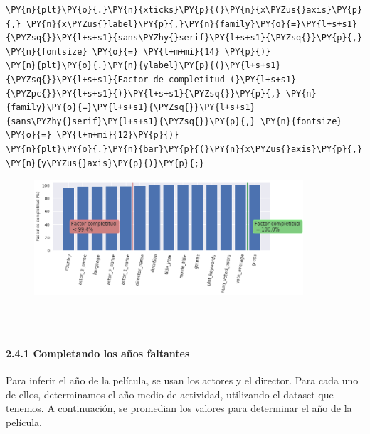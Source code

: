 \begin{tcolorbox}[breakable, size=fbox, boxrule=1pt, pad at break*=1mm,colback=cellbackground, colframe=cellborder]
\begin{Verbatim}[commandchars=\\\{\}]
\PY{n}{plt}\PY{o}{.}\PY{n}{xticks}\PY{p}{(}\PY{n}{x\PYZus{}axis}\PY{p}{,} \PY{n}{x\PYZus{}label}\PY{p}{,}\PY{n}{family}\PY{o}{=}\PY{l+s+s1}{\PYZsq{}}\PY{l+s+s1}{sans\PYZhy{}serif}\PY{l+s+s1}{\PYZsq{}}\PY{p}{,} \PY{n}{fontsize} \PY{o}{=} \PY{l+m+mi}{14} \PY{p}{)}
\PY{n}{plt}\PY{o}{.}\PY{n}{ylabel}\PY{p}{(}\PY{l+s+s1}{\PYZsq{}}\PY{l+s+s1}{Factor de completitud (}\PY{l+s+s1}{\PYZpc{}}\PY{l+s+s1}{)}\PY{l+s+s1}{\PYZsq{}}\PY{p}{,} \PY{n}{family}\PY{o}{=}\PY{l+s+s1}{\PYZsq{}}\PY{l+s+s1}{sans\PYZhy{}serif}\PY{l+s+s1}{\PYZsq{}}\PY{p}{,} \PY{n}{fontsize} \PY{o}{=} \PY{l+m+mi}{12}\PY{p}{)}
\PY{n}{plt}\PY{o}{.}\PY{n}{bar}\PY{p}{(}\PY{n}{x\PYZus{}axis}\PY{p}{,} \PY{n}{y\PYZus{}axis}\PY{p}{)}\PY{p}{;}
\end{Verbatim}
\end{tcolorbox}

\begin{figure}[h]
    \centering
    \captionsetup{width=10cm}
    \includegraphics[width=10cm]{./contenido/imagenes/output_72_0.png}

\end{figure}
    { \hspace*{\fill} \\}
    
    \begin{center}\rule{0.5\linewidth}{\linethickness}\end{center}

\paragraph{2.4.1 Completando los años
faltantes}\label{completando-los-auxf1os-faltantes}

Para inferir el año de la película, se usan los actores y el director.
Para cada uno de ellos, determinamos el año medio de actividad,
utilizando el dataset que tenemos. A continuación, se promedian los
valores para determinar el año de la película.

